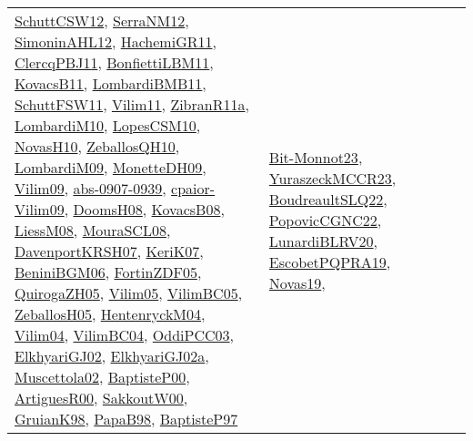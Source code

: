 {\begin{longtable}{lp{3cm}>{\raggedright}p{6cm}>{\raggedright}p{6cm}p{8cm}}
\href{papers/SchuttCSW12.pdf}{SchuttCSW12}\cite{SchuttCSW12}, \href{papers/SerraNM12.pdf}{SerraNM12}\cite{SerraNM12}, \href{papers/SimoninAHL12.pdf}{SimoninAHL12}\cite{SimoninAHL12}, \href{articles/HachemiGR11.pdf}{HachemiGR11}\cite{HachemiGR11}, \href{papers/ClercqPBJ11.pdf}{ClercqPBJ11}\cite{ClercqPBJ11}, \href{papers/BonfiettiLBM11.pdf}{BonfiettiLBM11}\cite{BonfiettiLBM11}, \href{articles/KovacsB11.pdf}{KovacsB11}\cite{KovacsB11}, \href{papers/LombardiBMB11.pdf}{LombardiBMB11}\cite{LombardiBMB11}, \href{articles/SchuttFSW11.pdf}{SchuttFSW11}\cite{SchuttFSW11}, \href{papers/Vilim11.pdf}{Vilim11}\cite{Vilim11}, \href{papers/ZibranR11a.pdf}{ZibranR11a}\cite{ZibranR11a}, \href{papers/LombardiM10.pdf}{LombardiM10}\cite{LombardiM10}, \href{articles/LopesCSM10.pdf}{LopesCSM10}\cite{LopesCSM10}, \href{articles/NovasH10.pdf}{NovasH10}\cite{NovasH10}, \href{articles/ZeballosQH10.pdf}{ZeballosQH10}\cite{ZeballosQH10}, \href{papers/LombardiM09.pdf}{LombardiM09}\cite{LombardiM09}, \href{papers/MonetteDH09.pdf}{MonetteDH09}\cite{MonetteDH09}, \href{papers/Vilim09.pdf}{Vilim09}\cite{Vilim09}, \href{articles/abs-0907-0939.pdf}{abs-0907-0939}\cite{abs-0907-0939}, \href{papers/cpaior-Vilim09.pdf}{cpaior-Vilim09}\cite{cpaior-Vilim09}, \href{papers/DoomsH08.pdf}{DoomsH08}\cite{DoomsH08}, \href{articles/KovacsB08.pdf}{KovacsB08}\cite{KovacsB08}, \href{articles/LiessM08.pdf}{LiessM08}\cite{LiessM08}, \href{papers/MouraSCL08.pdf}{MouraSCL08}\cite{MouraSCL08}, \href{papers/DavenportKRSH07.pdf}{DavenportKRSH07}\cite{DavenportKRSH07}, \href{papers/KeriK07.pdf}{KeriK07}\cite{KeriK07}, \href{papers/BeniniBGM06.pdf}{BeniniBGM06}\cite{BeniniBGM06}, \href{papers/FortinZDF05.pdf}{FortinZDF05}\cite{FortinZDF05}, \href{papers/QuirogaZH05.pdf}{QuirogaZH05}\cite{QuirogaZH05}, \href{papers/Vilim05.pdf}{Vilim05}\cite{Vilim05}, \href{articles/VilimBC05.pdf}{VilimBC05}\cite{VilimBC05}, \href{articles/ZeballosH05.pdf}{ZeballosH05}\cite{ZeballosH05}, \href{papers/HentenryckM04.pdf}{HentenryckM04}\cite{HentenryckM04}, \href{papers/Vilim04.pdf}{Vilim04}\cite{Vilim04}, \href{papers/VilimBC04.pdf}{VilimBC04}\cite{VilimBC04}, \href{papers/OddiPCC03.pdf}{OddiPCC03}\cite{OddiPCC03}, \href{papers/ElkhyariGJ02.pdf}{ElkhyariGJ02}\cite{ElkhyariGJ02}, \href{papers/ElkhyariGJ02a.pdf}{ElkhyariGJ02a}\cite{ElkhyariGJ02a}, \href{papers/Muscettola02.pdf}{Muscettola02}\cite{Muscettola02}, \href{articles/BaptisteP00.pdf}{BaptisteP00}\cite{BaptisteP00}, \href{articles/ArtiguesR00.pdf}{ArtiguesR00}\cite{ArtiguesR00}, \href{articles/SakkoutW00.pdf}{SakkoutW00}\cite{SakkoutW00}, \href{papers/GruianK98.pdf}{GruianK98}\cite{GruianK98}, \href{articles/PapaB98.pdf}{PapaB98}\cite{PapaB98}, \href{papers/BaptisteP97.pdf}{BaptisteP97}\cite{BaptisteP97} & \href{papers/Bit-Monnot23.pdf}{Bit-Monnot23}\cite{Bit-Monnot23}, \href{articles/YuraszeckMCCR23.pdf}{YuraszeckMCCR23}\cite{YuraszeckMCCR23}, \href{papers/BoudreaultSLQ22.pdf}{BoudreaultSLQ22}\cite{BoudreaultSLQ22}, \href{papers/PopovicCGNC22.pdf}{PopovicCGNC22}\cite{PopovicCGNC22}, \href{articles/LunardiBLRV20.pdf}{LunardiBLRV20}\cite{LunardiBLRV20}, \href{articles/EscobetPQPRA19.pdf}{EscobetPQPRA19}\cite{EscobetPQPRA19}, \href{articles/Novas19.pdf}{Novas19}\cite{Novas19}, 
\end{longtable}}
